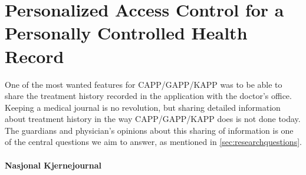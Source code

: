 \section{Personalized Access Control for a Personally Controlled Health Record}
\label{personalhealthrecords}

One of the most wanted features for CAPP/GAPP/KAPP was to be able to share the treatment history recorded in the application with the doctor's office. Keeping a medical journal is no revolution, but sharing detailed information about treatment history in the way CAPP/GAPP/KAPP does is not done today. The guardians and physician's opinions about this sharing of information is one of the central questions we aim to answer, as mentioned in \ref{sec:researchquestions}.



\paragraph{Nasjonal Kjernejournal}
